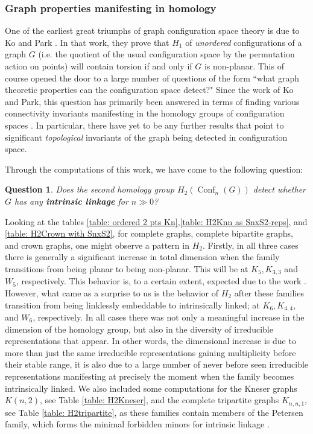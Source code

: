 \documentclass[12pt]{amsart}
\newtheorem{quest}[thm]{Question}
\theoremstyle{definition}
\newcommand{\conf}{\operatorname{Conf}}
\begin{document}
\subsubsection{Graph properties manifesting in homology}

One of the earliest great triumphs of graph configuration space theory is due to Ko and Park \cite{KP}. In that work, they prove that $H_1$ of \emph{unordered} configurations of a graph $G$ (i.e. the quotient of the usual configuration space by the permutation action on points) will contain torsion if and only if $G$ is non-planar. This of course opened the door to a large number of questions of the form ``what graph theoretic properties can the configuration space detect?" Since the work of Ko and Park, this question has primarily been answered in terms of finding various connectivity invariants manifesting in the homology groups of configuration spaces \cite{R2,ADCK2}. In particular, there have yet to be any further results that point to significant \emph{topological} invariants of the graph being detected in configuration space.

Through the computations of this work, we have come to the following question:

\begin{quest}
Does the second homology group $H_2(\conf_n(G))$ detect whether $G$ has any \textbf{intrinsic linkage} for $n \gg 0$? 
\end{quest}

Looking at the tables \ref{table: ordered 2 pts Kn},\ref{table: H2Knn as SnxS2-reps}, and \ref{table: H2Crown with SnxS2}, for complete graphs, complete bipartite graphs, and crown graphs, one might observe a pattern in $H_2$. Firstly, in all three cases there is generally a significant increase in total dimension when the family transitions from being planar to being non-planar. This will be at $K_5, K_{3,3}$ and $W_{5}$, respectively. This behavior is, to a certain extent, expected due to the work \cite{AK}. However, what came as a surprise to us is the behavior of $H_2$ after these families transition from being linklessly embeddable to intrinsically linked; at $K_6, K_{4,4},$ and $W_6$, respectively. In all cases there was not only a meaningful increase in the dimension of the homology group, but also in the diversity of irreducible representations that appear. In other words, the dimensional increase is due to more than just the same irreducible representations gaining multiplicity before their stable range, it is also due to a large number of never before seen irreducible representations manifesting at precisely the moment when the family becomes intrinsically linked. We also included some computations for the Kneser graphs $K(n,2)$, see Table \ref{table: H2Kneser}, and the complete tripartite graphs $K_{n,n,1}$, see Table \ref{table: H2tripartite}, as these families contain members of the Petersen family, which forms the minimal forbidden minors for intrinsic linkage \cite{robertson1993linkless}.  
\end{document}
